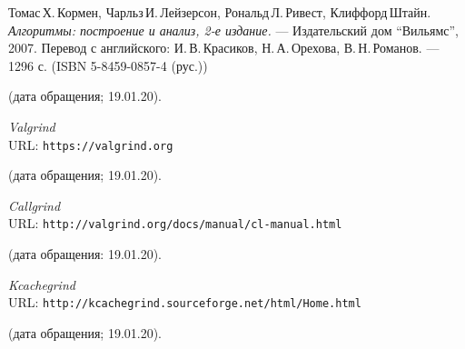 \begin{thebibliography}{99}

Томас\,Х.\,Кормен, Чарльз\,И.\,Лейзерсон, Рональд\,Л.\,Ривест, Клиффорд\,Штайн.
{\itshape Алгоритмы: построение и анализ, 2-е издание.} --- Издательский дом \enquote{Вильямс}, 2007. Перевод с английского: И.\,В.\,Красиков, Н.\,А.\,Орехова, В.\,Н.\,Романов. --- 1296 с. (ISBN 5-8459-0857-4 (рус.))

(дата обращения; 19.01.20).

{\itshape Valgrind} \\URL: \texttt{https://valgrind.org} 

(дата обращения; 19.01.20).

{\itshape Callgrind} \\URL: \texttt{http://valgrind.org/docs/manual/cl-manual.html} 

(дата обращения: 19.01.20).

{\itshape Kcachegrind} \\URL: \texttt{http://kcachegrind.sourceforge.net/html/Home.html} 

(дата обращения; 19.01.20).

\end{thebibliography}
\pagebreak